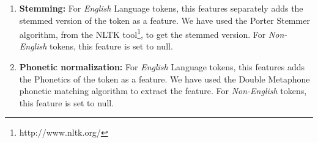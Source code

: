 \documentclass[11pt,a4paper]{article}
\begin{document}
\begin{enumerate}
\item \textbf{Stemming:} For \textit{English} Language tokens, this features separately adds the stemmed  version of the token as a feature. We have used the Porter Stemmer algorithm, from the NLTK tool\footnote{http://www.nltk.org/}, to get the stemmed version. For \textit{Non-English} tokens, this feature is set to null.
\item \textbf{Phonetic normalization:}  For \textit{English} Language tokens, this features adds the Phonetics of the token as a feature. We have used the Double Metaphone phonetic matching algorithm \cite{philips2000double} to extract the feature. For \textit{Non-English} tokens, this feature is set to null.
\end{enumerate}

\begin{table*}[t]
\centering
{}
\caption{Precision (P), Recall (R) and F-Scores (F) of constrained system, Runs-1 and Run-2 on Finer grained tag set. Here the notation are, \textbf{BN-FB}: Facebook data in English-Bengali, \textbf{BN-TWT}: Twitter data in English-Bengali, \textbf{BN-WA}: WhatsApp data in English-Bengali, \textbf{HI-FB}: Facebook data in English-Hindi, \textbf{HI-TWT}: Twitter data in English-Hindi, \textbf{HI-WA}: WhatsApp data in English-Hindi, \textbf{TE-FB}: Facebook data in English-Telugu, \textbf{TE-TWT}: Twitter data in English-Telugu, \textbf{TE-WA}: WhatsApp data in English-Telugu }
\label{table-1}
\end{table*} 
\end{document}

